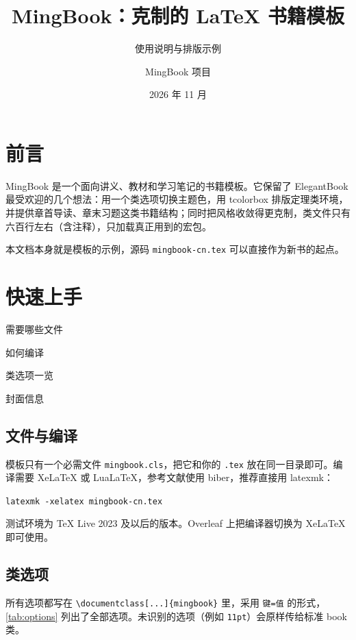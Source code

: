 \documentclass[lang=cn, theme=blue, thmstyle=fancy, twoside]{mingbook}
\title{MingBook：克制的 \LaTeX{} 书籍模板}
\subtitle{使用说明与排版示例}
\author{MingBook 项目}
\institute{latex 模板合集}
\date{2026 年 11 月}
\begin{document}
\maketitle

\frontmatter
\chapter{前言}

MingBook 是一个面向讲义、教材和学习笔记的书籍模板。它保留了 ElegantBook 最受欢迎的几个想法：用一个类选项切换主题色，用 tcolorbox 排版定理类环境，并提供章首导读、章末习题这类书籍结构；同时把风格收敛得更克制，类文件只有六百行左右（含注释），只加载真正用到的宏包。

本文档本身就是模板的示例，源码 \texttt{mingbook-cn.tex} 可以直接作为新书的起点。

\tableofcontents

\mainmatter

\chapter{快速上手}

\begin{introduction}
  \item 需要哪些文件
  \item 如何编译
  \item 类选项一览
  \item 封面信息
\end{introduction}

\section{文件与编译}

模板只有一个必需文件 \texttt{mingbook.cls}，把它和你的 \texttt{.tex} 放在同一目录即可。编译需要 XeLaTeX 或 LuaLaTeX，参考文献使用 biber，推荐直接用 latexmk：
\begin{center}
  \texttt{latexmk -xelatex mingbook-cn.tex}
\end{center}
测试环境为 \TeX{} Live 2023 及以后的版本。Overleaf 上把编译器切换为 XeLaTeX 即可使用。

\section{类选项}

所有选项都写在 \verb|\documentclass[...]{mingbook}| 里，采用 \texttt{键=值} 的形式，\cref{tab:options} 列出了全部选项。未识别的选项（例如 \texttt{11pt}）会原样传给标准 book 类。
\end{document}
